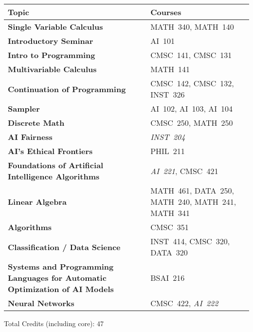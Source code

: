\begin{longtable}{p{7cm}>{\raggedleft\arraybackslash}p{7cm}}
Topic & Courses \\
\toprule
\textbf{Single Variable Calculus} & MATH~340, MATH~140                     \\
\textbf{Introductory Seminar} & AI~101                                     \\
\textbf{Intro to Programming} & CMSC~141, CMSC~131                         \\
\textbf{Multivariable Calculus} & MATH~141                                 \\
\textbf{Continuation of Programming} & CMSC~142, CMSC~132, INST~326        \\
\textbf{Sampler} & AI~102, AI~103, AI~104                                  \\
\textbf{Discrete Math} & CMSC~250, MATH~250                                \\
\textbf{AI Fairness} & \textit{INST~204}                                   \\
\textbf{AI's Ethical Frontiers} & PHIL~211                                 \\
\textbf{Foundations of Artificial Intelligence Algorithms} & \textit{AI~221}, CMSC~421 \\
\textbf{Linear Algebra} & MATH~461, DATA~250, MATH~240, MATH~241, MATH~341 \\
\textbf{Algorithms} & CMSC~351                                             \\
\textbf{Classification / Data Science} & INST~414, CMSC~320, DATA~320      \\
\textbf{Systems and Programming Languages for Automatic Optimization of AI Models} & BSAI~216 \\
\textbf{Neural Networks} & CMSC~422, \textit{AI~222}                       \\
\bottomrule
\end{longtable}
Total Credits (including core): 47
